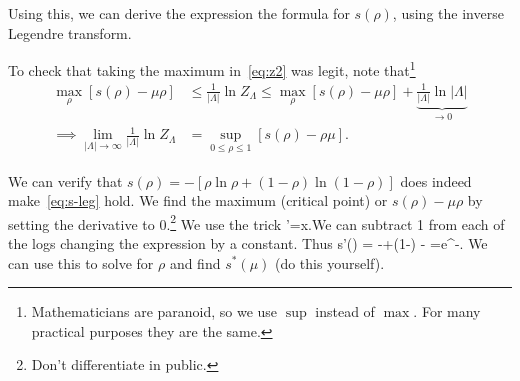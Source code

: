 
Using this, we can derive the expression the formula for $s(\rho)$, using the inverse Legendre transform.

To check that taking the maximum in~\eqref{eq:z2} was legit, note that\footnote{Mathematicians are paranoid, so we use $\sup$ instead of $\max$. For many practical purposes they are the same.}
\begin{align*}%
\max_{\rho}[s(\rho) - \mu \rho] &\le \frac{1}{|\Lambda|}\ln Z_{\Lambda} \le \max_\rho [s(\rho)-\mu \rho] + \underbrace{\frac{1}{|\Lambda|}\ln |\Lambda|}_{\to 0}\\
\implies
\lim_{|\Lambda|\to \infty} \frac{1}{|\Lambda|}\ln Z_{\Lambda} &= \sup_{0\le \rho\le 1} [s(\rho) - \rho \mu].
\end{align*}


We can verify that  $s(\rho) = -[\rho\ln \rho +(1-\rho) \ln (1-\rho)]$
does indeed make~\eqref{eq:s-leg} hold. We find the maximum (critical point) or $s(\rho)-\mu \rho$ by setting the derivative to 0.\footnote{Don't differentiate in public.} 
We use the trick 
\be[x(\ln x-1)]'=\ln x.\ee We can subtract 1 from each of the logs changing the expression by a constant. Thus
\be
s'(\rho) = -\ln \rho +\ln (1-\rho) - \mu \implies {}=e^{-\mu}.
\ee
We can use this to solve for $\rho$ and find $s^*(\mu)$ (do this yourself).


